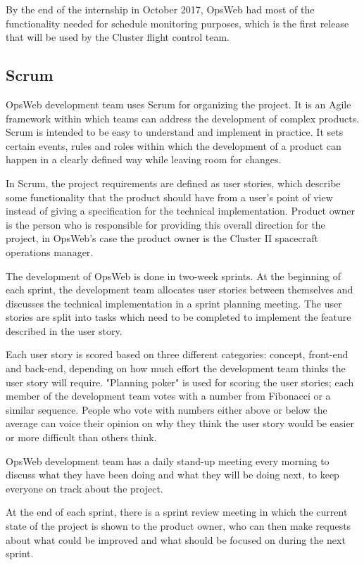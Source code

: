 By the end of the internship in October 2017, OpsWeb had most of the functionality needed for schedule monitoring purposes, which is the first release that will be used by the Cluster flight control team.
\subsection{Scrum}
OpsWeb development team uses Scrum for organizing the project. \cite{beck2001manifesto, scrum} It is an Agile framework within which teams can address the development of complex products. Scrum is intended to be easy to understand and implement in practice. It sets certain events, rules and roles within which the development of a product can happen in a clearly defined way while leaving room for changes.

In Scrum, the project requirements are defined as user stories, which describe some functionality that the product should have from a user's point of view instead of giving a specification for the technical implementation. Product owner is the person who is responsible for providing this overall direction for the project, in OpsWeb's case the product owner is the Cluster II spacecraft operations manager.

The development of OpsWeb is done in two-week sprints. At the beginning of each sprint, the development team allocates user stories between themselves and discusses the technical implementation in a sprint planning meeting. The user stories are split into tasks which need to be completed to implement the feature described in the user story. 

Each user story is scored based on three different categories: concept, front-end and back-end, depending on how much effort the development team thinks the user story will require. "Planning poker" is used for scoring the user stories; each member of the development team votes with a number from Fibonacci or a similar sequence. People who vote with numbers either above or below the average can voice their opinion on why they think the user story would be easier or more difficult than others think. \cite{grenning2002planning}

OpsWeb development team has a daily stand-up meeting every morning to discuss what they have been doing and what they will be doing next, to keep everyone on track about the project.

At the end of each sprint, there is a sprint review meeting in which the current state of the project is shown to the product owner, who can then make requests about what could be improved and what should be focused on during the next sprint.

